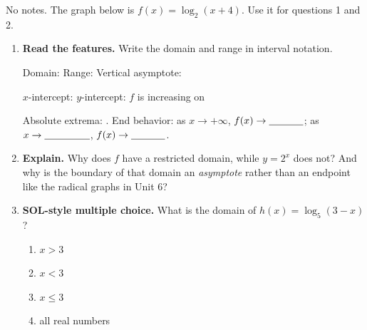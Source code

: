 \documentclass[10pt]{article}
\newcommand{\lgrid}[4]{%
  \draw[step=1, linegray!40, very thin] (#1,#3) grid (#2,#4);
  \draw[->, semithick, charcoal] (#1,0)--(#2,0) node[below right, font=\scriptsize]{$x$};
  \draw[->, semithick, charcoal] (0,#3)--(0,#4) node[left, font=\scriptsize]{$y$};}
\newcommand{\logcurve}[5]{\draw[very thick, forest, domain=#4:#5, samples=120, smooth]
  plot ({pow(#1,\x-(#3))+(#2)},{\x});}
\begin{document}
\namedateperiod

\vspace{0.08in}

No notes. The graph below is $f(x) = \log_2(x+4)$. Use it for questions 1 and 2.
\begin{center}
\end{center}

\begin{enumerate}[leftmargin=1.8em, itemsep=8pt]
  \item \textbf{Read the features.} Write the domain and range in interval notation.

        Domain: \blank{3.2cm} \quad Range: \blank{3.2cm} \quad Vertical asymptote: \blank{2.0cm}

        \vspace{3pt}
        $x$-intercept: \blank{1.8cm} \quad $y$-intercept: \blank{1.8cm} \quad
        $f$ is increasing on \blank{2.6cm}

        \vspace{3pt}
        Absolute extrema: \blank{2.0cm}. \quad End behavior: as $x\to+\infty$,
        $f(x)\to\blank{1.2cm}$; \; as $x\to\blank{1.6cm}$, $f(x)\to\blank{1.2cm}$.

  \item \textbf{Explain.} Why does $f$ have a restricted domain, while $y=2^{x}$ does not?
        And why is the boundary of that domain an \emph{asymptote} rather than an endpoint like the
        radical graphs in Unit 6?

  \item \textbf{SOL-style multiple choice.} What is the domain of $h(x) = \log_5(3-x)$?
        \begin{enumerate}[label=\Alph*., leftmargin=1.9em, itemsep=1pt]
          \item $x > 3$
          \item $x < 3$
          \item $x \le 3$
          \item all real numbers
        \end{enumerate}
\end{enumerate}
\end{document}
